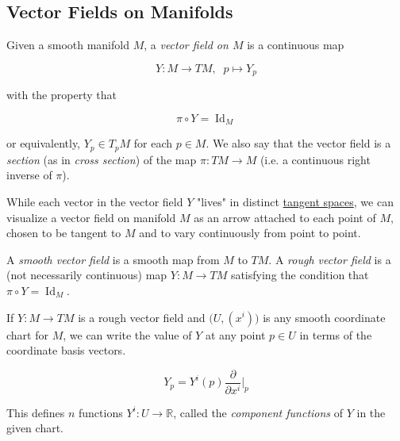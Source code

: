\documentclass{article}
\DeclareMathOperator{\Id}{Id}
\newcounter{definition}[section]
\begin{document}
  \subsection{Vector Fields on Manifolds}

    \begin{definition}
      \label{def:vector-field-on-m}
      Given a smooth manifold $M$, a \textit{vector field on $M$} is a continuous map 

        \begin{equation}
          Y: M \to TM, \;\; p \mapsto Y_p
        \end{equation}

      with the property that 

        \begin{equation}
          \pi \circ Y = \Id_M
        \end{equation}

      or equivalently, $Y_p \in T_p M$ for each $p \in M$. We also say that the vector field is a \textit{section} (as in \textit{cross section}) of the map $\pi: TM \to M$ (i.e. a continuous right inverse of $\pi$). 
    \end{definition}

    While each vector in the vector field $Y$ "lives" in distinct \hyperref[mv-def:tangent-space]{tangent spaces}, we can visualize a vector field on manifold $M$ as an arrow attached to each point of $M$, chosen to be tangent to $M$ and to vary continuously from point to point. 

    \begin{definition}
      \label{def:smooth-and-rough-vector-fields}
      A \textit{smooth vector field} is a smooth map from $M$ to $TM$. A \textit{rough vector field} is a (not necessarily continuous) map $Y: M \to TM$ satisfying the condition that $\pi\circ Y = \Id_M$. 
    \end{definition}

    If $Y: M \to TM$ is a rough vector field and $\big( U, (x^i)\big)$ is any smooth coordinate chart for $M$, we can write the value of $Y$ at any point $p \in U$ in terms of the coordinate basis vectors. 

      \begin{equation}
        Y_p = Y^i (p) \frac{\partial}{\partial x^i} \bigg|_p
      \end{equation}

    This defines $n$ functions $Y^i: U \to \mathbb{R}$, called the \textit{component functions} of $Y$ in the given chart. 
\end{document}
